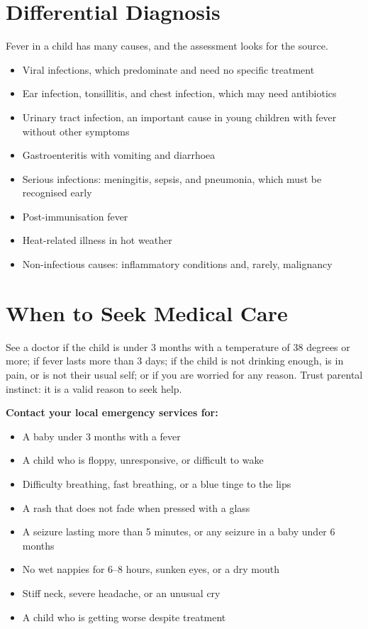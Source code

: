 \section*{Differential Diagnosis}
Fever in a child has many causes, and the assessment looks for the source.
\begin{itemize}
    \item Viral infections, which predominate and need no specific treatment
    \item Ear infection, tonsillitis, and chest infection, which may need antibiotics
    \item Urinary tract infection, an important cause in young children with fever without other symptoms
    \item Gastroenteritis with vomiting and diarrhoea
    \item Serious infections: meningitis, sepsis, and pneumonia, which must be recognised early
    \item Post-immunisation fever
    \item Heat-related illness in hot weather
    \item Non-infectious causes: inflammatory conditions and, rarely, malignancy
\end{itemize}

\section*{When to Seek Medical Care}
See a doctor if the child is under 3 months with a temperature of 38 degrees or more; if fever lasts more than 3 days; if the child is not drinking enough, is in pain, or is not their usual self; or if you are worried for any reason. Trust parental instinct: it is a valid reason to seek help.

\textbf{Contact your local emergency services for:}
\begin{itemize}
    \item A baby under 3 months with a fever
    \item A child who is floppy, unresponsive, or difficult to wake
    \item Difficulty breathing, fast breathing, or a blue tinge to the lips
    \item A rash that does not fade when pressed with a glass
    \item A seizure lasting more than 5 minutes, or any seizure in a baby under 6 months
    \item No wet nappies for 6--8 hours, sunken eyes, or a dry mouth
    \item Stiff neck, severe headache, or an unusual cry
    \item A child who is getting worse despite treatment
\end{itemize}


